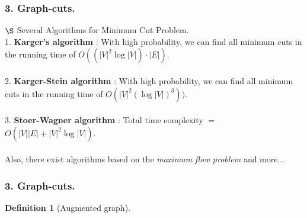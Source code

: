 \documentclass[11pt]{beamer}
\newtheorem*{pf of lemma}{\it Proof of the \normalfont \bf Lemma}
\newtheorem*{pf of claim}{\it Proof of the \normalfont \sf Claim}
\newtheorem{defi}{Definition}[section]
\begin{document}
\begin{frame}
\frametitle{3. Graph-cuts.}

$\S$ Several Algorithms for Minimum Cut Problem. \\
1. \textbf{Karger's algorithm} : With high probability, we can find all minimum cuts in the running time of $O((|V|^2 \log |V|) \cdot |E|)$. \\ \ \\
2. \textbf{Karger-Stein algorithm} : With high probability, we can find all minimum cuts in the running time of $O(|V|^2 (\log |V|)^3))$. \\ \ \\
3. \textbf{Stoer-Wagner algorithm} : Total time complexity $=$ $O(|V||E| + |V|^2 \log |V|)$. \\

\ \\ Also, there exist algorithms based on the \textit{maximum flow problem} and more...

\end{frame}

\begin{frame}
\frametitle{3. Graph-cuts.}

\begin{defi} [Augmented graph] 
\end{defi}

\end{frame}
\end{document}
